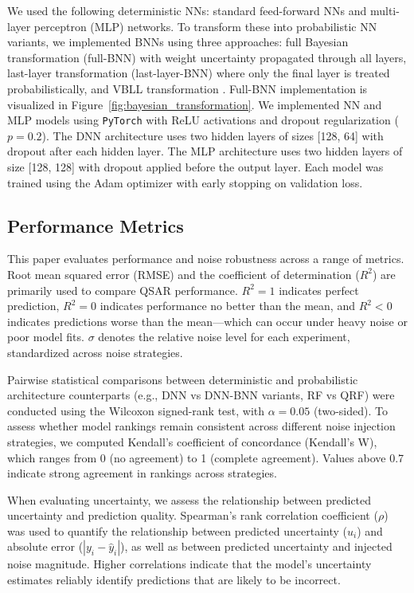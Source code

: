 \documentclass[pdflatex,sn-mathphys-num]{sn-jnl}%
\theoremstyle{thmstyleone}%
\theoremstyle{thmstyletwo}%
\theoremstyle{thmstylethree}%
\begin{document}
We used the following deterministic NNs: standard feed-forward NNs and multi-layer perceptron (MLP) networks. To transform these into probabilistic NN variants, we implemented BNNs using three approaches: full Bayesian transformation (full-BNN) with weight uncertainty propagated through all layers, last-layer transformation (last-layer-BNN) where only the final layer is treated probabilistically, and VBLL transformation \citep{Harrison2024}. Full-BNN implementation is visualized in Figure~\ref{fig:bayesian_transformation}. We implemented NN and MLP models using \texttt{PyTorch} \citep{pytorchGeometric} with ReLU activations and dropout regularization ($p=0.2$). The DNN architecture uses two hidden layers of sizes [128, 64] with dropout after each hidden layer. The MLP architecture uses two hidden layers of size [128, 128] with dropout applied before the output layer. Each model was trained using the Adam optimizer with early stopping on validation loss.

\subsection{Performance Metrics}

This paper evaluates performance and noise robustness across a range of metrics. Root mean squared error (RMSE) and the coefficient of determination ($R^2$) are primarily used to compare QSAR performance. $R^2 = 1$ indicates perfect prediction, $R^2 = 0$ indicates performance no better than the mean, and $R^2 < 0$ indicates predictions worse than the mean---which can occur under heavy noise or poor model fits. $\sigma$ denotes the relative noise level for each experiment, standardized across noise strategies. 

Pairwise statistical comparisons between deterministic and probabilistic architecture counterparts (e.g., DNN vs DNN-BNN variants, RF vs QRF) were conducted using the Wilcoxon signed-rank test, with $\alpha = 0.05$ (two-sided). To assess whether model rankings remain consistent across different noise injection strategies, we computed Kendall's coefficient of concordance (Kendall's W), which ranges from 0 (no agreement) to 1 (complete agreement). Values above 0.7 indicate strong agreement in rankings across strategies.

When evaluating uncertainty, we assess the relationship between predicted uncertainty and prediction quality. Spearman's rank correlation coefficient ($\rho$) was used to quantify the relationship between predicted uncertainty ($u_i$) and absolute error ($|y_i - \hat{y}_i|$), as well as between predicted uncertainty and injected noise magnitude. Higher correlations indicate that the model's uncertainty estimates reliably identify predictions that are likely to be incorrect.
\end{document}
